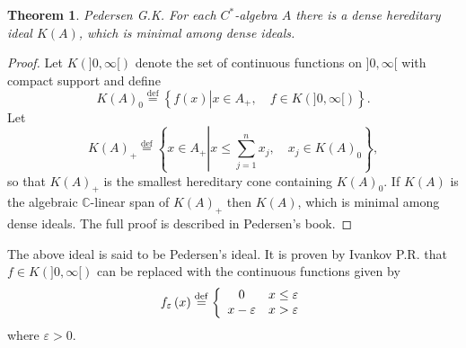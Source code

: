 \documentclass{beamer}
\theoremstyle{plain}
\newtheorem{thm}{Theorem}%
\newcommand{\be}{\begin{equation}}
\newcommand{\ee}{\end{equation}}
\newcommand{\C}{\mathbb{C}}
\newcommand{\eps}{\varepsilon}                    %
\newcommand{\bydef}{\stackrel{\mathrm{def}}{=}}
\begin{document}
\begin{frame}
	\begin{thm}\label{pedersen_ideal_thm} \alert{Pedersen G.K.}
		For each $C^*$-algebra $A$ there is a dense hereditary ideal $K(A)$,
		which is minimal among dense ideals.
		
	\end{thm}
	\begin{proof}
		Let $K(]0, \infty [)$ denote the set of continuous functions on $]0, \infty [$ with 
		compact support and define 
		\be\label{pedersen_k0_eqn}
		K\left( A \right)_0 \bydef \left\{f\left(x\right) \left|x \in A_+, \quad f \in K(]0, \infty [) \right.\right\}.
		\ee
		Let 
		\be\label{pedersen_k_plus_eqn}
		K\left( A \right)_+ \bydef \left\{x \in A_+ \left|x \le \sum_{j = 1}^nx_j, \quad x_j \in  	K\left( A \right)_0\right.\right\}, 	
		\ee
		so that $	K\left( A \right)_+$ is the smallest hereditary cone  containing $K\left( A \right)_0$. If $K(A)$ 
		is  the algebraic  $\C$-linear span of $K(A)_+$ then $K(A)$,
		which is minimal among dense ideals. The full  proof is  described in Pedersen's book.
	\end{proof}
	
\end{frame}

\begin{frame}
	The above ideal is said to be \alert{Pedersen's ideal}. It is  proven by \alert{Ivankov P.R.} that $f \in K(]0, \infty [)$ can be replaced with the continuous functions given by
		$$
		f_\eps\left( x\right)  \bydef\left\{
		\begin{array}{c l}
			0 &x \le \eps \\
			x - \eps & x > \eps
		\end{array}\right.
	$$
	where $\eps > 0$.
\end{frame}
\end{document}
